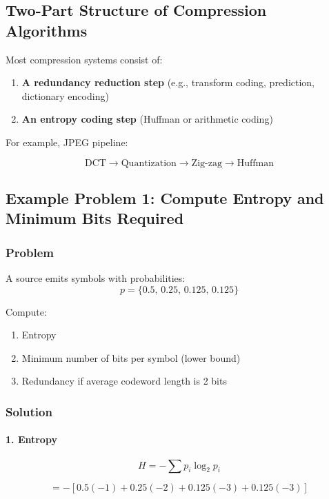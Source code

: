 \documentclass{AnantDocumentation}
\begin{document}
\subsection{Two-Part Structure of Compression Algorithms}

Most compression systems consist of:

\begin{enumerate}
\item \textbf{A redundancy reduction step}  
(e.g., transform coding, prediction, dictionary encoding)

\item \textbf{An entropy coding step}  
(Huffman or arithmetic coding)
\end{enumerate}

For example, JPEG pipeline:

\[
\text{DCT} \rightarrow \text{Quantization} \rightarrow \text{Zig-zag} \rightarrow \text{Huffman}
\]

\subsection{Example Problem 1: Compute Entropy and Minimum Bits Required}

\subsubsection*{Problem}

A source emits symbols with probabilities:
\[
p = \{0.5,\, 0.25,\, 0.125,\, 0.125\}
\]

Compute:
\begin{enumerate}
\item Entropy
\item Minimum number of bits per symbol (lower bound)
\item Redundancy if average codeword length is 2 bits
\end{enumerate}

\subsubsection*{Solution}

\paragraph{1. Entropy}
\[
H = -\sum p_i\log_2 p_i
\]

\[
= -[0.5(-1) + 0.25(-2) + 0.125(-3) + 0.125(-3)]
\]
\end{document}
